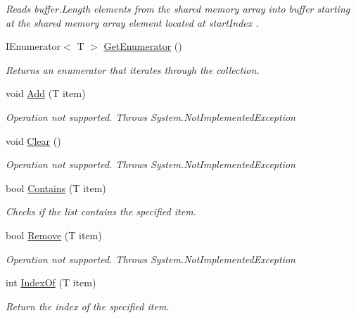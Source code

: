 \begin{DoxyCompactItemize}
\begin{DoxyCompactList}\small\item\em Reads buffer.\+Length elements from the shared memory array into {\itshape buffer}  starting at the shared memory array element located at {\itshape start\+Index} . \end{DoxyCompactList}\item 
I\+Enumerator$<$ T $>$ \hyperlink{class_shared_memory_1_1_shared_array_aba2e421eafcdde1ef3cd542e5684ed82}{Get\+Enumerator} ()
\begin{DoxyCompactList}\small\item\em Returns an enumerator that iterates through the collection. \end{DoxyCompactList}\item 
void \hyperlink{class_shared_memory_1_1_shared_array_a4f969bc8b74455d31b9ab8b607d70d82}{Add} (T item)
\begin{DoxyCompactList}\small\item\em Operation not supported. Throws System.\+Not\+Implemented\+Exception \end{DoxyCompactList}\item 
void \hyperlink{class_shared_memory_1_1_shared_array_a61c14c70eef2f4ce529ade2f43230544}{Clear} ()
\begin{DoxyCompactList}\small\item\em Operation not supported. Throws System.\+Not\+Implemented\+Exception \end{DoxyCompactList}\item 
bool \hyperlink{class_shared_memory_1_1_shared_array_a9edc084d084fe2c128693417179aa6b2}{Contains} (T item)
\begin{DoxyCompactList}\small\item\em Checks if the list contains the specified item. \end{DoxyCompactList}\item 
bool \hyperlink{class_shared_memory_1_1_shared_array_a55165b2d571610b4806536a6ed55d877}{Remove} (T item)
\begin{DoxyCompactList}\small\item\em Operation not supported. Throws System.\+Not\+Implemented\+Exception \end{DoxyCompactList}\item 
int \hyperlink{class_shared_memory_1_1_shared_array_a56ba6048e972f037fc8ea294e090a33d}{Index\+Of} (T item)
\begin{DoxyCompactList}\small\item\em Return the index of the specified item. \end{DoxyCompactList}\item 

\end{DoxyCompactItemize}
